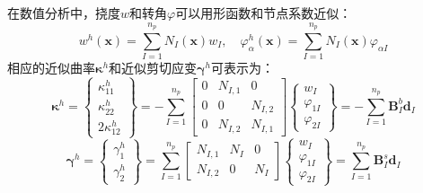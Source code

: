 在数值分析中，挠度$w$和转角$\varphi$可以用形函数和节点系数近似：
\begin{equation}
    w^h(\boldsymbol x) = \sum_{I=1}^{n_p} N_I(\boldsymbol x) w_I, \quad
    \varphi^h_\alpha(\boldsymbol x) = \sum_{I=1}^{n_p} N_I(\boldsymbol x) \varphi_{\alpha I}
\end{equation}
相应的近似曲率$\pmb\kappa^h$和近似剪切应变$\pmb\gamma^h$可表示为：
\begin{equation}\label{z-qulv}
    \boldsymbol\kappa^h = 
    \begin{Bmatrix}
    \kappa^h_{11} \\ \kappa^h_{22} \\ 2\kappa^h_{12} 
    \end{Bmatrix} = -\sum_{I=1}^{n_p}
    \begin{bmatrix}
    0 & N_{I,1} & 0 \\ 0 & 0 & N_{I,2} \\ 0 & N_{I,2} & N_{I,1}
    \end{bmatrix}
    \begin{Bmatrix}
    w_I \\ \varphi_{1I} \\ \varphi_{2I}
    \end{Bmatrix} = - \sum_{I=1}^{n_p} \boldsymbol B^b_I \boldsymbol d_I
\end{equation}
\begin{equation}\label{z-jqyb}
    \boldsymbol\gamma^h = 
    \begin{Bmatrix}
    \gamma^h_1 \\ \gamma^h_2
    \end{Bmatrix} = \sum_{I=1}^{n_p}
    \begin{bmatrix}
    N_{I,1} & N_I & 0 \\
    N_{I,2} & 0 & N_I
    \end{bmatrix}
    \begin{Bmatrix}
    w_I \\ \varphi_{1I} \\ \varphi_{2I}
    \end{Bmatrix} = \sum_{I=1}^{n_p} \boldsymbol B^s_I \boldsymbol d_I
\end{equation}

